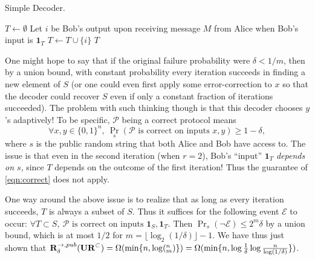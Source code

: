 \begin{algorithm}[H] 
  \caption{Simple Decoder.} \label{algo:wrong}
  \begin{algorithmic}[1]
    \State $T\leftarrow \emptyset$
      \State Let $i$ be Bob's output upon receiving message $M$ from Alice when Bob's input is $\mathbf{1}_T$
      \State $T \leftarrow T \cup\{i\}$
    \EndFor
    \State \Return $T$
    \EndProcedure
  \end{algorithmic}
\end{algorithm}

One might hope to say that if the original failure probability were $\delta < 1/m$, then by a union bound, with constant probability every iteration succeeds in finding a new element of $S$ (or one could even first apply some error-correction to $x$ so that the decoder could recover $S$ even if only a constant fraction of iterations succeeded). The problem with such thinking though is that this decoder chooses $y$'s adaptively! To be specific, $\mathcal{P}$ being a correct protocol means
\begin{equation}
\forall x,y\in\{0,1\}^n,\ \Pr_s(\mathcal{P}\text{ is correct on inputs }x,y) \ge 1-\delta , \label{eqn:correct}
\end{equation}
where $s$ is the public random string that both Alice and Bob have access to. The issue is that even in the second iteration (when $r=2$), Bob's ``input'' $\mathbf{1}_T$ {\em depends on $s$}, since $T$ depends on the outcome of the first iteration! Thus the guarantee of \eqref{eqn:correct} does not apply.

One way around the above issue is to realize that as long as every iteration succeeds, $T$ is always a subset of $S$. Thus it suffices for the following event $\mathcal{E}$ to occur: $\forall T\subset S,\ \mathcal{P}\text{ is correct on inputs }\mathbf{1}_S, \mathbf{1}_T$. Then $\Pr_s(\neg \mathcal{E}) \le 2^m\delta$ by a union bound, which is at most $1/2$ for $m = \lfloor \log_2(1/\delta)\rfloor - 1$. We have thus just shown that $\mathbf{R}^{\rightarrow,pub}_\delta(\mathbf{UR}^\subset) = \Omega(\min\{n, \log(^n_m)\}) = \Omega(\min\{n, \log\frac 1{\delta}\log \frac n{\log(1/\delta)}\})$.

